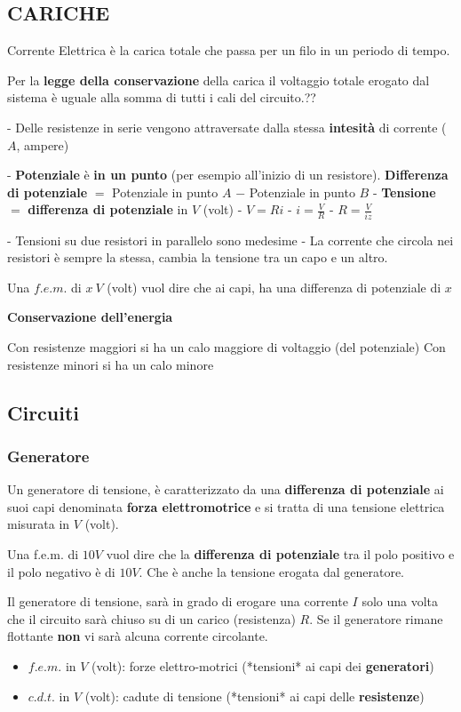 \documentclass{article}
\begin{document}
\subsection{CARICHE}

Corrente Elettrica è la carica totale che passa per un filo in un periodo di tempo.

Per la \textbf{legge della conservazione} della carica il voltaggio totale erogato dal sistema è uguale alla somma di tutti i cali del circuito.??

- Delle resistenze in serie vengono attraversate dalla stessa \textbf{intesità} di corrente ($A$, ampere)

- \textbf{Potenziale} è \textbf{in un punto} (per esempio all'inizio di un resistore).
  \textbf{Differenza di potenziale} $=$ Potenziale in punto $A$ $-$ Potenziale in punto $B$
- \textbf{Tensione} $=$ \textbf{differenza di potenziale} in $V$ (volt)
  - $V=Ri$
  - $i=\frac{V}{R}$
  - $R=\frac{V}{iz}$

- Tensioni su due resistori in parallelo sono medesime
- La corrente che circola nei resistori è sempre la stessa, cambia la tensione tra un capo e un altro.

Una $f.e.m.$ di $x\ V$ (volt) vuol dire che ai capi, ha una differenza di potenziale di $x$

\textbf{Conservazione dell'energia}

Con resistenze maggiori si ha un calo maggiore di voltaggio (del potenziale)
Con resistenze minori si ha un calo minore


\subsection{Circuiti}
\subsubsection{Generatore}

Un generatore di tensione, è caratterizzato da una \textbf{differenza di potenziale} ai suoi capi denominata \textbf{forza elettromotrice} e si tratta di una tensione elettrica misurata in $V$ (volt).

Una f.e.m. di $10V$ vuol dire che la \textbf{differenza di potenziale} tra il polo positivo e il polo negativo è di $10V$. Che è anche la tensione erogata dal generatore.

Il generatore di tensione, sarà in grado di erogare una corrente $I$ solo una volta che il circuito sarà chiuso su di un carico (resistenza) $R$. 
Se il generatore rimane flottante \textbf{non} vi sarà alcuna corrente circolante.
\begin{itemize}
  \item $f.e.m.$ in $V$ (volt): forze elettro-motrici (*tensioni* ai capi dei \textbf{generatori})
  \item $c.d.t.$ in $V$ (volt): cadute di tensione (*tensioni* ai capi delle \textbf{resistenze})
\end{itemize}
\end{document}
